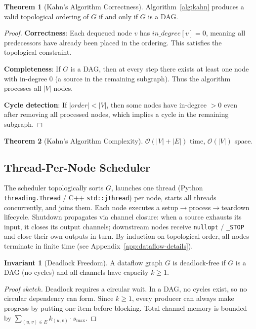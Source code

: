 \documentclass[11pt,a4paper,twoside]{article}
\theoremstyle{definition}
\newtheorem{theorem}{Theorem}[section]
\newtheorem{invariant}{Invariant}[section]
\theoremstyle{remark}
\newcommand{\BigO}{\mathcal{O}}
\begin{document}
\begin{theorem}[Kahn's Algorithm Correctness]
Algorithm~\ref{alg:kahn} produces a valid topological ordering of $G$ if and only if $G$ is a DAG.
\end{theorem}
\begin{proof}
\textbf{Correctness}: Each dequeued node $v$ has $\textit{in\_degree}[v] = 0$, meaning all predecessors have already been placed in the ordering. This satisfies the topological constraint.

\textbf{Completeness}: If $G$ is a DAG, then at every step there exists at least one node with in-degree 0 (a source in the remaining subgraph). Thus the algorithm processes all $|V|$ nodes.

\textbf{Cycle detection}: If $|\textit{order}| < |V|$, then some nodes have in-degree $> 0$ even after removing all processed nodes, which implies a cycle in the remaining subgraph.
\end{proof}

\begin{theorem}[Kahn's Algorithm Complexity]
$\BigO(|V| + |E|)$ time, $\BigO(|V|)$ space.
\end{theorem}

\subsection{Thread-Per-Node Scheduler}

The scheduler topologically sorts $G$, launches one thread (Python \texttt{threading.Thread} / C++ \texttt{std::jthread}) per node, starts all threads concurrently, and joins them. Each node executes a setup$\to$process$\to$teardown lifecycle. Shutdown propagates via channel closure: when a source exhausts its input, it closes its output channels; downstream nodes receive \texttt{nullopt} / \texttt{\_STOP} and close their own outputs in turn. By induction on topological order, all nodes terminate in finite time (see Appendix~\ref{app:dataflow-details}).

\begin{invariant}[Deadlock Freedom]
\label{inv:deadlock}
A dataflow graph $G$ is deadlock-free if $G$ is a DAG (no cycles) and all channels have capacity $k \geq 1$.
\end{invariant}
\begin{proof}[Proof sketch]
Deadlock requires a circular wait. In a DAG, no cycles exist, so no circular dependency can form. Since $k \geq 1$, every producer can always make progress by putting one item before blocking. Total channel memory is bounded by $\sum_{(u,v) \in E} k_{(u,v)} \cdot s_{\max}$.
\end{proof}
\end{document}

